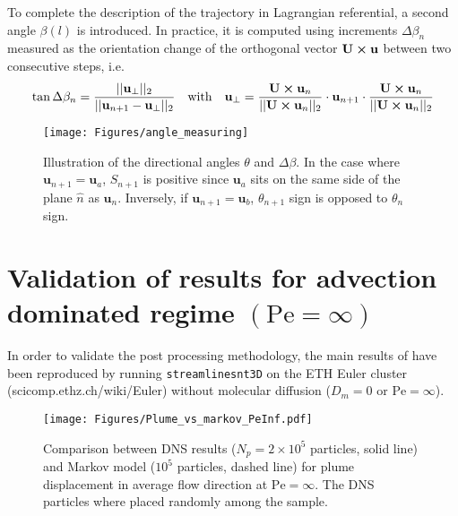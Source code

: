 To complete the description of the trajectory in Lagrangian referential, a second angle $\beta(l)$ is introduced. In practice, it is computed using increments $\Delta \beta_n$ measured as the orientation change of the orthogonal vector $\textbf{U}\cross \textbf{u}$ between two consecutive steps, i.e.
\begin{equation}
\tan\Delta\beta_n = \frac{||\textbf{u}_\perp||_2}{||\textbf{u}_{n+1}-\textbf{u}_\perp||_2}
\quad\textrm{with}\quad
\textbf{u}_\perp =\frac{\textbf{U}\cross\textbf{u}_{n}}{||\textbf{U}\cross\textbf{u}_n||_2}\cdot \textbf{u}_{n+1}\cdot\frac{\textbf{U}\cross\textbf{u}_{n}}{||\textbf{U}\cross\textbf{u}_n||_2}
\end{equation}

\begin{figure}
	\centering
	\texttt{[image: Figures/angle\_measuring]}
	\caption{Illustration of the directional angles $\theta$ and $\Delta \beta$. In the case where $\textbf{u}_{n+1} = \textbf{u}_a$, $S_{n+1}$ is positive since $\textbf{u}_a$ sits on the same side of the plane $\hat{n}$ as $\textbf{u}_n$. Inversely, if $\textbf{u}_{n+1} = \textbf{u}_b$, $\theta_{n+1}$ sign is opposed to $\theta_n$ sign. }
	\label{fig:anglemeasuring}
\end{figure}


\section{Validation of \cite{Meyer2016} results for advection dominated regime $(\mathrm{Pe}=\infty)$}
In order to validate the post processing methodology, the main results of \cite{Meyer2016} have been reproduced by running \texttt{streamlinesnt3D} on the ETH Euler cluster (scicomp.ethz.ch/wiki/Euler) without molecular diffusion ($D_m=0$ or $\mathrm{Pe}=\infty$).\\ 
\begin{figure}[h]
	\centering
	\texttt{[image: Figures/Plume\_vs\_markov\_PeInf.pdf]}
	\caption{Comparison between DNS results ($N_p=2\times 10^5$ particles, solid line) and Markov model ($10^5$ particles, dashed line) for plume displacement in average flow direction at $\mathrm{Pe}=\infty$. The DNS particles where placed randomly among the sample.}
	\label{fig:plume_peinf}
\end{figure}

